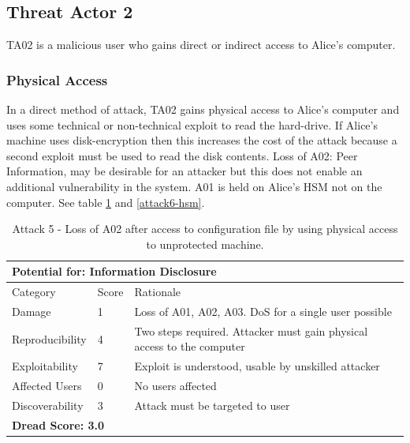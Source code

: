 \documentclass [11pt, proquest] {uwthesis}[2020/02/24]
\begin{document}
\subsection{Threat Actor 2}
TA02 is a malicious user who gains direct or indirect access to Alice's computer. 

\subsubsection{Physical Access}
In a direct method of attack, TA02 gains physical access to Alice's computer and uses some technical or non-technical exploit to read the hard-drive. If Alice's machine uses disk-encryption then this increases the cost of the attack because a second exploit must be used to read the disk contents.
Loss of A02: Peer Information, may be desirable for an attacker but this does not enable an additional vulnerability in the system.
A01 is held on Alice's HSM not on the computer.
See table \ref{attack5-hsm} and \ref{attack6-hsm}.

\begin{table}[H]
\label{attack5-hsm}
\begin{tabular}{|m{3cm}|m{.9cm}|p{27em} |}
\multicolumn{3}{l}{Potential for: Information Disclosure}                   \\
\hline
Category & Score & Rationale \\
\hline
Damage          & 1     & Loss of A01, A02, A03. DoS for a single user possible            \\
\hline
Reproducibility & 4     & Two steps required. Attacker must gain physical access to the computer     \\
\hline
Exploitability & 7      & Exploit is understood, usable by unskilled attacker \\
\hline
Affected Users  & 0     &  No users affected                         \\
\hline
Discoverability & 3     & Attack must be targeted to user \\
\hline
\multicolumn{3}{l}{\textbf{Dread Score: 3.0}} 
\end{tabular}
\caption{Attack 5 - Loss of A02 after access to configuration file by using physical access to unprotected machine. }
\end{table}
\end{document}
